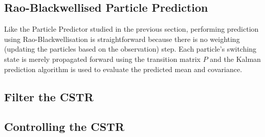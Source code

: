 \documentclass[../masters.tex]{subfiles}
\begin{document}
\subsection{Rao-Blackwellised Particle Prediction}
Like the Particle Predictor studied in the previous section, performing prediction using Rao-Blackwellisation is straightforward because there is no weighting (updating the particles based on the observation) step. Each particle's switching state is merely propagated forward using the transition matrix $P$ and the Kalman prediction algorithm is used to evaluate the predicted mean and covariance.

\subsection{Filter the CSTR}

\subsection{Controlling the CSTR}




\end{document}
